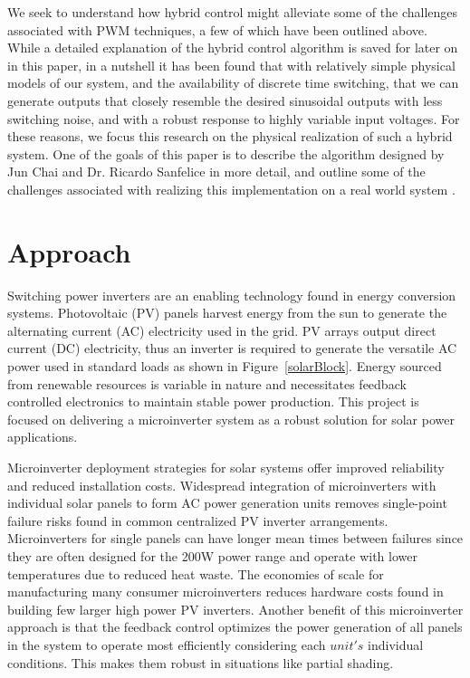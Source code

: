 We seek to understand how hybrid control might alleviate some of the challenges associated with PWM techniques, a few of which have been outlined above. While a detailed explanation of the hybrid control algorithm is saved for later on in this paper, in a nutshell it has been found that with relatively simple physical models of our system, and the availability of discrete time switching, that we can generate outputs that closely resemble the desired sinusoidal outputs with less switching noise, and with a robust response to highly variable input voltages. For these reasons, we focus this research on the physical realization of such a hybrid system. One of the goals of this paper is to describe the algorithm designed by Jun Chai and Dr. Ricardo Sanfelice in more detail, and outline some of the challenges associated with realizing this implementation on a real world system \cite{ricardo}.

\section{Approach}
Switching power inverters are an enabling technology found in energy conversion systems. Photovoltaic (PV) panels harvest energy from the sun to generate the alternating current (AC) electricity used in the grid. PV arrays output direct current (DC) electricity, thus an inverter is required to generate the versatile AC power used in standard loads as shown in Figure~\ref{solarBlock}. Energy sourced from renewable resources is variable in nature and necessitates feedback controlled electronics to maintain stable power production.  This project is focused on delivering a microinverter system as a robust solution for solar power applications. 

Microinverter deployment strategies for solar systems offer improved reliability and reduced installation costs. Widespread integration of microinverters with individual solar panels to form AC power generation units removes single-point failure risks found in common centralized PV inverter arrangements. Microinverters for single panels can have longer mean times between failures since they are often designed for the 200W power range and operate with lower temperatures due to reduced heat waste. The economies of scale for manufacturing many consumer microinverters reduces hardware costs found in building few larger high power PV inverters.\cite{microchip} Another benefit of this microinverter approach is that the feedback control optimizes the power generation of all panels in the system to operate most efficiently considering each $unit's$ individual conditions. This makes them robust in situations like partial shading.

